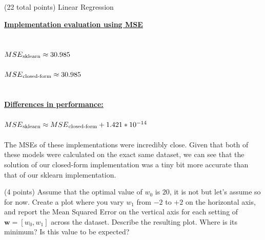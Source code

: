 \documentclass[12pt]{article}
\begin{document}
\begin{question}{(22 total points) Linear Regression}
\begin{subquestion}
\begin{answerbox}{22em}
\large{\textbf{\underline{Implementation evaluation using MSE}}}\\
\\
\\
\normalsize{
$MSE\textsubscript{sklearn} \approx 30.985$\\
\\
$MSE\textsubscript{closed-form} \approx 30.985$\\
\\
\\
\textbf{\underline{Differences in performance:}}\\
\\
$MSE\textsubscript{sklearn} \approx MSE\textsubscript{closed-form}   +   1.421 * 10^{-14}$\\
\\
The MSEs of these implementations were incredibly close. Given that both of these models were calculated on the exact same dataset, we can see that the solution of our closed-form implementation was a tiny bit more accurate than that of our sklearn implementation.
}
\end{answerbox}



\end{subquestion}




%
%
\begin{subquestion}{(4 points) Assume that the optimal value of $w_0$ is $20$, it is not but let's assume so for now. 
Create a plot where you vary $w_1$ from $-2$ to $+2$ on the horizontal axis, and report the Mean Squared Error on the vertical axis for each setting of $\mathbf{w} = [w_0, w_1]$ across the dataset. 
Describe the resulting plot. Where is its minimum? Is this value to be expected?\\ 
}



\end{subquestion}
\end{question}
\end{document}
